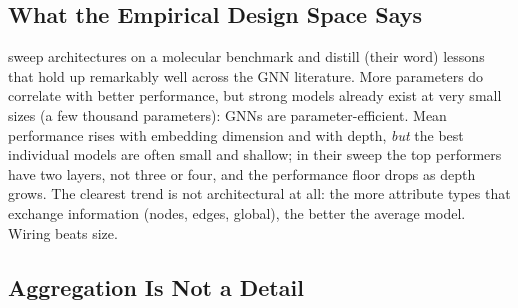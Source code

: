 \subsection{What the Empirical Design Space Says}\label{sec:gnn:playground}

\citet{SanchezLengeling2021} sweep architectures on a molecular benchmark and distill (their word) lessons that hold up remarkably well across the GNN literature. More parameters do correlate with better performance, but strong models already exist at very small sizes (a few thousand parameters): GNNs are parameter-efficient. Mean performance rises with embedding dimension and with depth, \emph{but} the best individual models are often small and shallow; in their sweep the top performers have two layers, not three or four, and the performance floor drops as depth grows. The clearest trend is not architectural at all: the more attribute types that exchange information (nodes, edges, global), the better the average model. Wiring beats size.

\subsection{Aggregation Is Not a Detail}\label{sec:gnn:aggregation}

